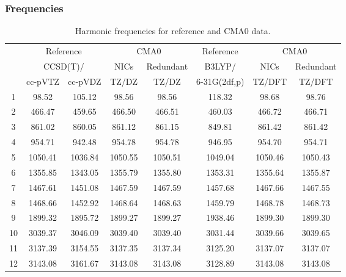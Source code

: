 \documentclass[10pt,oneside]{article}
\begin{document}
\begin{table}[h!]
\subsubsection*{Frequencies}
\centering
\caption{Harmonic frequencies for reference and CMA0 data.}
\begin{tabular}{cccccccc}
\toprule
{} & \multicolumn{2}{c}{Reference} & \multicolumn{2}{c}{CMA0} &    Reference & \multicolumn{2}{c}{CMA0} \\
{} & \multicolumn{2}{c}{CCSD(T)/} &    NICs &  Redundant &       B3LYP/ &    NICs & Redundant \\
{} &   cc-pVTZ & cc-pVDZ &   TZ/DZ &      TZ/DZ & 6-31G(2df,p) &  TZ/DFT &    TZ/DFT \\
\midrule
1  &     98.52 &  105.12 &   98.56 &      98.56 &       118.32 &   98.68 &     98.76 \\
2  &    466.47 &  459.65 &  466.50 &     466.51 &       460.03 &  466.72 &    466.71 \\
3  &    861.02 &  860.05 &  861.12 &     861.15 &       849.81 &  861.42 &    861.42 \\
4  &    954.71 &  942.48 &  954.78 &     954.78 &       946.95 &  954.70 &    954.71 \\
5  &   1050.41 & 1036.84 & 1050.55 &    1050.51 &      1049.04 & 1050.46 &   1050.43 \\
6  &   1355.85 & 1343.05 & 1355.79 &    1355.80 &      1353.31 & 1355.64 &   1355.87 \\
7  &   1467.61 & 1451.08 & 1467.59 &    1467.59 &      1457.68 & 1467.66 &   1467.55 \\
8  &   1468.66 & 1452.92 & 1468.64 &    1468.63 &      1459.79 & 1468.78 &   1468.73 \\
9  &   1899.32 & 1895.72 & 1899.27 &    1899.27 &      1938.46 & 1899.30 &   1899.30 \\
10 &   3039.37 & 3046.09 & 3039.40 &    3039.40 &      3031.44 & 3039.66 &   3039.65 \\
11 &   3137.39 & 3154.55 & 3137.35 &    3137.34 &      3125.20 & 3137.07 &   3137.07 \\
12 &   3143.08 & 3161.67 & 3143.08 &    3143.08 &      3128.89 & 3143.08 &   3143.08 \\
\bottomrule
\end{tabular}
\end{table}
\end{document}
